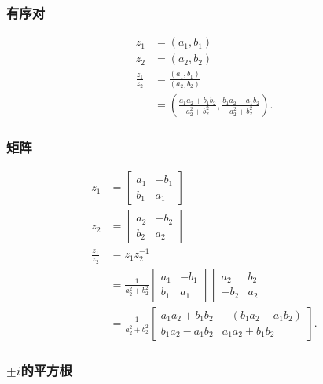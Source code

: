 \subsubsection*{有序对}
$$
\begin{aligned}
z_{1} & =\left(a_{1}, b_{1}\right) \\
z_{2} & =\left(a_{2}, b_{2}\right) \\
\frac{z_{1}}{z_{2}} & =\frac{\left(a_{1}, b_{1}\right)}{\left(a_{2}, b_{2}\right)} \\
& =\left(\frac{a_{1} a_{2}+b_{1} b_{2}}{a_{2}^{2}+b_{2}^{2}}, \frac{b_{1} a_{2}-a_{1} b_{2}}{a_{2}^{2}+b_{2}^{2}}\right) .
\end{aligned}
$$

\subsubsection*{矩阵}
$$
\begin{aligned}
z_{1} & =\left[\begin{array}{cc}
a_{1} & -b_{1} \\
b_{1} & a_{1}
\end{array}\right] \\
z_{2} & =\left[\begin{array}{cc}
a_{2} & -b_{2} \\
b_{2} & a_{2}
\end{array}\right] \\
\frac{z_{1}}{z_{2}} & =z_{1} z_{2}^{-1} \\
& =\frac{1}{a_{2}^{2}+b_{2}^{2}}\left[\begin{array}{cc}
a_{1} & -b_{1} \\
b_{1} & a_{1}
\end{array}\right]\left[\begin{array}{cc}
a_{2} & b_{2} \\
-b_{2} & a_{2}
\end{array}\right] \\
& =\frac{1}{a_{2}^{2}+b_{2}^{2}}\left[\begin{array}{ll}
a_{1} a_{2}+b_{1} b_{2} & -\left(b_{1} a_{2}-a_{1} b_{2}\right) \\
b_{1} a_{2}-a_{1} b_{2} & a_{1} a_{2}+b_{1} b_{2}
\end{array}\right] .
\end{aligned}
$$

\subsubsection{\boldmath $\pm i$的平方根}
